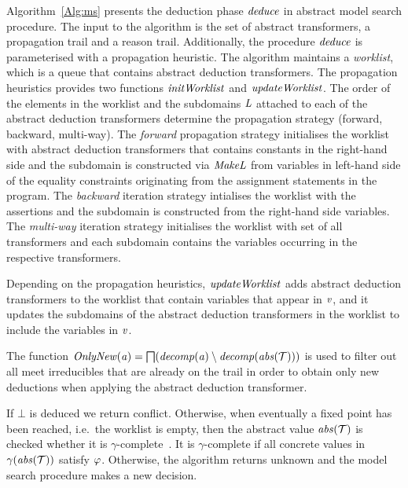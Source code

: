 Algorithm~\ref{Alg:ms} presents the deduction phase $\mathit{deduce}$ in 
abstract model search procedure.  The input to the algorithm is 
the set of abstract transformers, a propagation trail and a reason 
trail.  Additionally, the procedure $\mathit{deduce}$ is parameterised with 
a propagation heuristic. 
%
The algorithm maintains a  {\em worklist}, which is a queue that contains 
abstract deduction transformers.  
The propagation heuristics provides two 
functions $\mathit{initWorklist}$ and $\mathit{updateWorklist}$.
The order of the elements in the worklist and the subdomains $\mathit{L}$
attached to each of the abstract deduction transformers
determine the propagation strategy (forward, backward, multi-way).
%
The {\em forward} propagation strategy initialises the worklist with
abstract deduction transformers that contains constants in the
right-hand side and the subdomain is constructed via $\mathit{MakeL}$
from variables in left-hand side of the equality constraints
originating from the assignment statements in the program.
%
The {\em backward} iteration strategy intialises the worklist with the assertions and the subdomain is constructed from the right-hand side variables.
%
The {\em multi-way} iteration strategy initialises the worklist 
with set of all transformers and each subdomain contains the variables occurring in the respective transformers.

Depending on the propagation heuristics, $\mathit{updateWorklist}$ adds
abstract deduction transformers to the worklist that contain variables
that appear in $\mathit{v}$, and it updates the subdomains of
the abstract deduction transformers in the worklist 
to include the variables in $\mathit{v}$.

The function
$\mathit{OnlyNew}(\mathit{a})=\bigsqcap({\mathit{decomp}}(\mathit{a})\setminus{\mathit{decomp}}(\mathit{abs}(\mathcal{T})))$
is used to filter out all meet irreducibles that are already on the trail
in order to obtain only new deductions when applying the abstract deduction transformer.

If $\bot$ is deduced we return \textsf{conflict}.
Otherwise, when eventually a fixed point has been reached, i.e.\ the worklist is empty, then the abstract value $\mathit{abs}(\mathcal{T})$ is checked whether it is 
$\gamma$-complete~\cite{dhk2013-popl}. It is $\gamma$-complete if all concrete values in $\gamma(\mathit{abs}(\mathcal{T}))$ satisfy $\varphi$.
Otherwise, the algorithm returns \textsf{unknown} and the 
model search procedure makes a new decision.    

